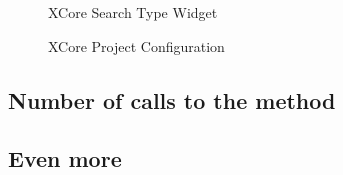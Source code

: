         \begin{figure}
             \centering
             \caption{XCore Search Type Widget}
             \label{fig:IMethond}
        \end{figure}    

        \begin{figure}
             \centering
             \caption{XCore Project Configuration}
             \label{fig:xcoreTableFull}
        \end{figure}    


       

\subsection{Number of calls to the method}

\subsection{Even more}
